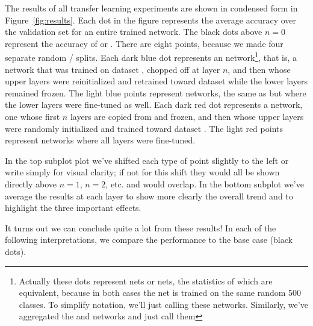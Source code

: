 The results of all transfer learning experiments are shown in condensed form in Figure~\ref{fig:results}. Each dot in the figure represents the average accuracy over the validation set for an entire trained network. The black dots above $n=0$ represent the accuracy of  or . There are eight points, because we made four separate random / splits. Each dark blue dot represents an  network\footnote{Actually these dots represent  nets or  nets, the statistics of which are equivalent, because in both cases the net is trained on the same random 500 classes. To simplify notation, we'll just calling these  networks. Similarly, we've aggregated the  and  networks and just call them }, that is, a network that was trained on dataset \dA, chopped off at layer $n$, and then whose upper layers were reinitialized and retrained toward dataset \dA while the lower layers remained frozen. The light blue points represent  networks, the same as  but where the lower layers were fine-tuned as well. Each dark red dot represents a  network, one whose first $n$ layers are copied from  and frozen, and then whose upper layers were randomly initialized and trained toward dataset \dA. The light red points represent  networks where all layers were fine-tuned.

In the top subplot plot we've shifted each type of point slightly to the left or write simply for visual clarity; if not for this shift they would all be shown directly above $n=1$, $n=2$, etc. and would overlap. In the bottom subplot we've average the results at each layer to show more clearly the overall trend and to highlight the three important effects.

It turns out we can conclude quite a lot from these results! In each of the following interpretations, we compare the performance to the base case (black dots).

